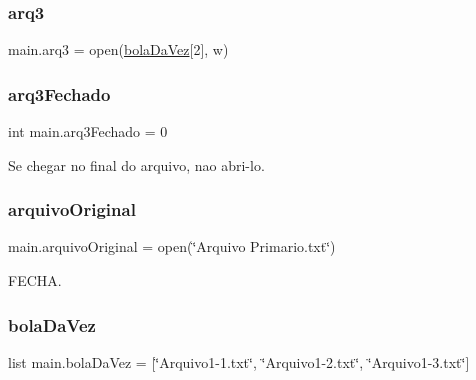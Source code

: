 \mbox{\label{namespacemain_a7feff388fb6011e74160375abce4a8b0}} 
\subsubsection{\texorpdfstring{arq3}{arq3}}
{\footnotesize\ttfamily main.\+arq3 = open(\hyperlink{namespacemain_a1a062cd836b3711b8674874524bf97dc}{bola\+Da\+Vez}\mbox{[}2\mbox{]}, \textquotesingle{}w\textquotesingle{})}

\mbox{\label{namespacemain_ac965b5f9e09d1ca878e16df935acf3a6}} 
\subsubsection{\texorpdfstring{arq3\+Fechado}{arq3Fechado}}
{\footnotesize\ttfamily int main.\+arq3\+Fechado = 0}



Se chegar no final do arquivo, nao abri-\/lo. 

\mbox{\label{namespacemain_a69f6c2f75d72bb66d07872728896db46}} 
\subsubsection{\texorpdfstring{arquivo\+Original}{arquivoOriginal}}
{\footnotesize\ttfamily main.\+arquivo\+Original = open(\char`\"{}Arquivo Primario.\+txt\char`\"{})}



F\+E\+C\+HA. 

\mbox{\label{namespacemain_a1a062cd836b3711b8674874524bf97dc}} 
\subsubsection{\texorpdfstring{bola\+Da\+Vez}{bolaDaVez}}
{\footnotesize\ttfamily list main.\+bola\+Da\+Vez = \mbox{[}\char`\"{}Arquivo1-\/1.txt\char`\"{}, \char`\"{}Arquivo1-\/2.txt\char`\"{}, \char`\"{}Arquivo1-\/3.txt\char`\"{}\mbox{]}}

